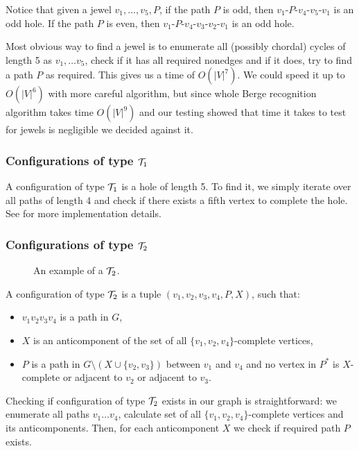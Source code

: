 Notice that given a jewel $v_1, \ldots, v_5, P$, if the path $P$ is odd, then $v_1$-$P$-$v_4$-$v_5$-$v_1$ is an odd hole. If the path $P$ is even, then $v_1$-$P$-$v_4$-$v_3$-$v_2$-$v_1$ is an odd hole.

Most obvious way to find a jewel is to enumerate all (possibly chordal) cycles of length 5 as $v_1, \ldots v_5$, check if it has all required nonedges and if it does, try to find a path $P$ as required. This gives us a time of $O(|V|^7)$. We could speed it up to $O(|V|^6)$ with more careful algorithm, but since whole Berge recognition algorithm takes time $O(|V|^9)$ and our testing showed that time it takes to test for jewels is negligible we decided against it.

\subsubsection{Configurations of type $\mathcal{T}_1$}

A configuration of type $\mathcal{T}_1$ is a hole of length 5. To find it, we simply iterate over all paths of length 4 and check if there exists a fifth vertex to complete the hole. See  for more implementation details.

\subsubsection{Configurations of type $\mathcal{T}_2$}

\begin{wrapfigure}{r}{0.35\textwidth}
	
	\caption{An example of a $\mathcal{T}_2$.}%
	\vspace{-.5cm}
\end{wrapfigure}

A configuration of type $\mathcal{T}_2$ is a tuple $(v_1, v_2, v_3, v_4, P, X)$, such that:
\begin{itemize}
	\item $v_1v_2v_3v_4$ is a path in $G$,
	\item $X$ is an anticomponent of the set of all $\{v_1, v_2, v_4\}$-complete vertices,
	\item $P$ is a path in $G\setminus(X \cup \{v_2, v_3\})$ between $v_1$ and $v_4$ and no vertex in $P^*$ is $X$-complete or adjacent to $v_2$ or adjacent to $v_3$.
\end{itemize}

Checking if configuration of type $\mathcal{T}_2$ exists in our graph is straightforward: we enumerate all paths $v_1\ldots v_4$, calculate set of all $\{v_1, v_2, v_4\}$-complete vertices and its anticomponents. Then, for each anticomponent $X$ we check if required path $P$ exists.

